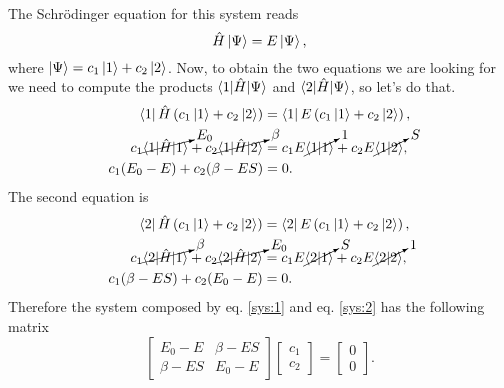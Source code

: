 \begin{questions}
\begin{solution}
The Schrödinger equation for this system reads
\begin{equation}
  \hat{H}\ket{\Psi} = E \ket{\Psi},
  \label{sch:1}
\end{equation}
where $\ket{\Psi} = c_1\ket{1} + c_2 \ket{2}$. Now, to obtain the two equations we are looking for we need to compute the products $\braket{1|\hat{H}|\Psi}$ and $\braket{2|\hat{H}|\Psi}$, so let's do that.
\begin{equation}
  \begin{aligned}[b]
    \bra{1}\hat{H}\left( c_1\ket{1} + c_2 \ket{2} \right) &= \bra{1} E \left( c_1\ket{1} + c_2 \ket{2} \right), \\
    c_1\cancelto{E_0}{\braket{1|\hat{H}|1}} + c_2\cancelto{\beta}{\braket{1|\hat{H}|2}} &= c_1E\cancelto{1}{\braket{1|1}} + c_2E\cancelto{S}{\braket{1|2}}, \\
    c_1(E_0 - E) + c_2(\beta - ES) &= 0.
  \end{aligned}
  \label{sys:1}
\end{equation}
The second equation is
\begin{equation}
  \begin{aligned}[b]
    \bra{2}\hat{H}\left( c_1\ket{1} + c_2 \ket{2} \right) &= \bra{2} E \left( c_1\ket{1} + c_2 \ket{2} \right), \\
    c_1\cancelto{\beta}{\braket{2|\hat{H}|1}} + c_2\cancelto{E_0}{\braket{2|\hat{H}|2}} &= c_1E\cancelto{S}{\braket{2|1}} + c_2E\cancelto{1}{\braket{2|2}}, \\
    c_1(\beta - ES) + c_2(E_0 - E) &= 0.
  \end{aligned}
  \label{sys:2}
\end{equation}
Therefore the system composed by eq. \ref{sys:1} and eq. \ref{sys:2} has the following matrix
\begin{equation}
  \begin{bmatrix}
    E_0 - E & \beta - ES \\
    \beta - ES & E_0 - E
  \end{bmatrix}
  \begin{bmatrix}
    c_1 \\
    c_2
  \end{bmatrix}
  =
  \begin{bmatrix}
    0 \\
    0
  \end{bmatrix}.
  \label{sys:full}
\end{equation}

\end{solution}
\end{questions}
